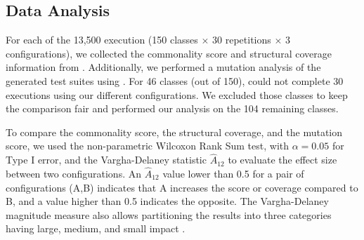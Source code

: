 \subsection{Data Analysis}

For each of the 13,500 execution (150 classes $\times$ 30 repetitions $\times$ 3 configurations), we collected the commonality score and structural coverage information from \evosuite. Additionally, we performed a mutation analysis of the generated test suites using \pit \cite{Coles2016a}. 
For 46 classes (out of 150), \evosuite could not complete 30 executions using our different configurations. We excluded those classes to keep the comparison fair and performed our analysis on the 104 remaining classes. 

To compare the commonality score, the structural coverage, and the mutation score, we used the non-parametric Wilcoxon Rank Sum test, with $\alpha = 0.05$ for Type I error, and the Vargha-Delaney statistic $\widehat{A}_{12}$ \cite{Vargha2000} to evaluate the effect size between two configurations. An $\widehat{A}_{12}$ value lower than 0.5 for a pair of configurations (A,B) indicates that A increases the score or coverage compared to B, and a value higher than 0.5 indicates the opposite. The Vargha-Delaney magnitude measure also allows partitioning the results into three categories having large, medium, and small impact \cite{Vargha2000}.

